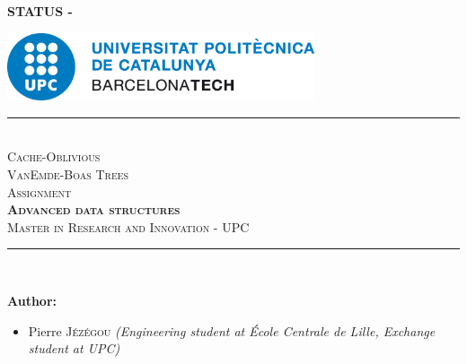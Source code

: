 \pagestyle{plain}
\pagecolor{white}

\begin{center}
    \color{red!50!white}
    \textbf{\huge{STATUS - \documentStatus}}
\end{center}

\vfill


\color{black}
\begin{center}
    \includegraphics[height=2cm]{images/logos/upc_logo.jpeg} \\
    \vfill
    \rule{\linewidth}{0.5mm} \\[1cm]
    {\Huge \textsc{\textcolor{fib_red}{Cache-Oblivious}}}\\[0.5cm]
    {\Huge \textsc{\textcolor{fib_red}{VanEmde-Boas Trees}}}\\[1cm]
    {\Large \textsc{Assignment}}\\[0.4cm]
    {\huge \textsc{\textbf{Advanced data structures}}}\\[1cm]
    {\Large \textsc{Master in Research and Innovation - UPC}}\\[0.4cm]
    \rule{\linewidth}{0.5mm} \\[1.5cm]
\end{center}

\vfill

\textbf{Author:}
\begin{itemize}
\item Pierre \textsc{Jézégou}\newline
\textit{(Engineering student at École Centrale de Lille, Exchange student at UPC)}
\end{itemize}

\newpage
\color{black}
\pagecolor{white}
\pagestyle{fancy}